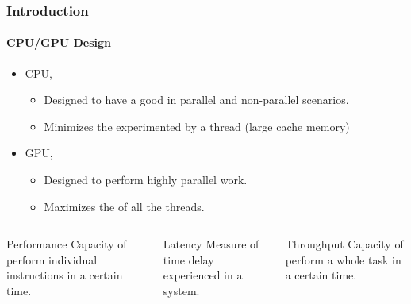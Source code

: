 \begin{frame}
    \frametitle{Introduction}
    \framesubtitle{CPU/GPU Design}

    \begin{itemize}
        \item CPU,
        \begin{itemize}
            \item Designed to have a good 
                  in parallel and non-parallel scenarios.
            \item Minimizes the  experimented by a thread
                  (large cache memory)
        \end{itemize}
        \item GPU,
            \begin{itemize}
            \item Designed to perform highly parallel work.
            \item Maximizes the  of all the threads.
            \end{itemize}
    \end{itemize}

    \begin{footnotesize}
        \begin{columns}
            \begin{column}{0.35\textwidth}
            \begin{block}{Performance}
                Capacity of perform individual instructions in a certain time.
            \end{block}
            \end{column}
            \begin{column}{0.3\textwidth}
            \begin{block}{Latency}
                Measure of time delay experienced in a system.
            \end{block}
            \end{column}
            \begin{column}{0.3\textwidth}
            \begin{block}{Throughput}
                Capacity of perform a whole task in a certain time.
            \end{block}
            \end{column}
        \end{columns}
    \end{footnotesize}

\end{frame}

